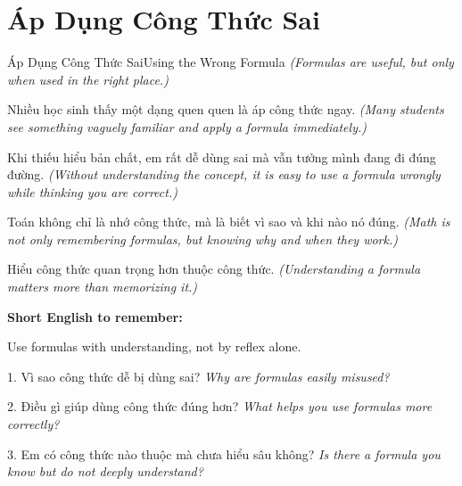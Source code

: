 \section{Áp Dụng Công Thức Sai}
\begin{truyen}{Áp Dụng Công Thức Sai}{Using the Wrong Formula}
\textit{(Formulas are useful, but only when used in the right place.)}

Nhiều học sinh thấy một dạng quen quen là áp công thức ngay.
\textit{(Many students see something vaguely familiar and apply a formula immediately.)}

Khi thiếu hiểu bản chất, em rất dễ dùng sai mà vẫn tưởng mình đang đi đúng đường.
\textit{(Without understanding the concept, it is easy to use a formula wrongly while thinking you are correct.)}

Toán không chỉ là nhớ công thức, mà là biết vì sao và khi nào nó đúng.
\textit{(Math is not only remembering formulas, but knowing why and when they work.)}
\end{truyen}

\begin{baihoc}
Hiểu công thức quan trọng hơn thuộc công thức.
\textit{(Understanding a formula matters more than memorizing it.)}
\end{baihoc}

\begin{ghinhoanh}
\textbf{Short English to remember:}

Use formulas with understanding, not by reflex alone.

\end{ghinhoanh}

\begin{tuhocnhanh}
1. Vì sao công thức dễ bị dùng sai? \textit{Why are formulas easily misused?}

2. Điều gì giúp dùng công thức đúng hơn? \textit{What helps you use formulas more correctly?}

3. Em có công thức nào thuộc mà chưa hiểu sâu không? \textit{Is there a formula you know but do not deeply understand?}
\end{tuhocnhanh}
\ngancach

